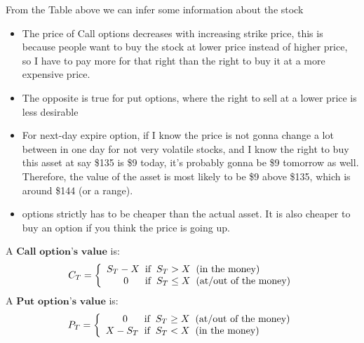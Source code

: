 \begin{multicols}{2}

From the Table above we can infer some information about the stock
\begin{itemize}
    \item The price of Call options decreases with increasing strike price, this is because people want to buy the stock at lower price instead of higher price, so I have to pay more for that right than the right to buy it at a more expensive price.
    \item The opposite is true for put options, where the right to sell at a lower price is less desirable
    \item For next-day expire option, if I know the price is not gonna change a lot between in one day for not very volatile stocks, and I know the right to buy this asset at say \$135 is \$9 today, it's probably gonna be \$9 tomorrow as well. Therefore, the value of the asset is most likely to be \$9 above \$135, which is around \$144 (or a range).
    \item options strictly has to be cheaper than the actual asset. It is also cheaper to buy an option if you think the price is going up.
\end{itemize}

A $\boxed{\textbf{Call option's value}}$ is:
\begin{gather*}
    C_T=\left\{
        \begin{array}{ll}
            \begin{split}
                S_T-X\hspace*{0.2cm}&\text{if}\hspace*{0.2cm}S_T>X\hspace*{0.2cm}\text{(in the money)}\\
                0\hspace*{0.6cm}&\text{if}\hspace*{0.2cm}S_T\leq X\hspace*{0.2cm}\text{(at/out of the money)}\\
            \end{split}
        \end{array}
        \right.
\end{gather*}
A $\boxed{\textbf{Put option's value}}$ is:
\begin{gather*}
    P_T=\left\{
        \begin{array}{ll}
            \begin{split}
                0\hspace*{0.6cm}&\text{if}\hspace*{0.2cm}S_T\geq X\hspace*{0.2cm}\text{(at/out of the money)}\\
                X-S_T\hspace*{0.2cm}&\text{if}\hspace*{0.2cm}S_T< X\hspace*{0.2cm}\text{(in the money)}\\
            \end{split}
        \end{array}
        \right.
\end{gather*}
\newpage


\end{multicols}
